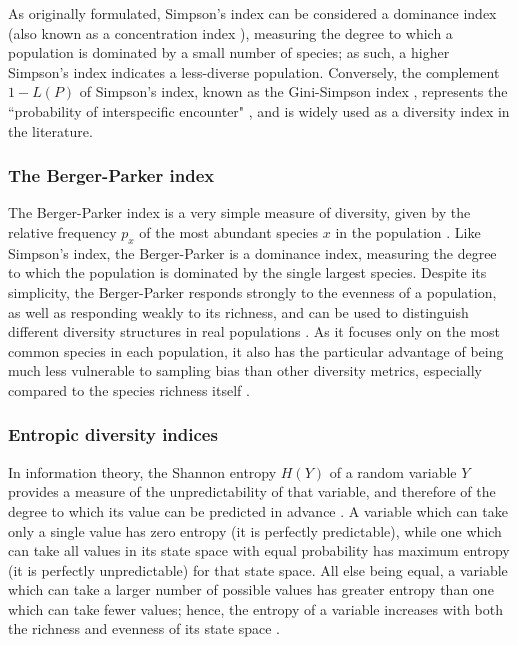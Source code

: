 \noindent As originally formulated, Simpson's index can be considered a dominance index (also known as a concentration  index \citep{simpson1949diversity}), measuring the degree to which a population is dominated by a small number of species; as such, a higher Simpson's index indicates a less-diverse population. Conversely, the complement $1-L(P)$ of Simpson's index, known as the Gini-Simpson index \citep{jost2006entropy}, represents the ``probability of interspecific encounter" \citep{peet1974diversity}, and is widely used as a diversity index in the literature.

\subsubsection{The Berger-Parker index}

The Berger-Parker index is a very simple measure of diversity, given by the relative frequency $p_x$ of the most abundant species $x$ in the population \parencite{berger1970diversity,caruso2008bergerparker}. Like Simpson's index, the Berger-Parker is a dominance index, measuring the degree to which the population is dominated by the single largest species. Despite its simplicity, the Berger-Parker responds strongly to the evenness of a population, as well as responding weakly to its richness, and can be used to distinguish different diversity structures in real populations \parencite{caruso2008bergerparker}. As it focuses only on the most common species in each population, it also has the particular advantage of being much less vulnerable to sampling bias than other diversity metrics, especially compared to the species richness itself \parencite{berger1970diversity}.

\subsubsection{Entropic diversity indices}
\label{sec:diversity-unitary-simple-entropy}

In information theory, the Shannon entropy $H(Y)$ of a random variable $Y$ provides a measure of the unpredictability of that variable, and therefore of the degree to which its value can be predicted in advance \citep{shannon1948communication1}. A variable which can take only a single value has zero entropy (it is perfectly predictable), while one which can take all values in its state space with equal probability has maximum entropy (it is perfectly unpredictable) for that state space. All else being equal, a variable which can take a larger number of possible values has greater entropy than one which can take fewer values; hence, the entropy of a variable increases with both the richness and evenness of its state space \citep{shannon1948communication1}.

